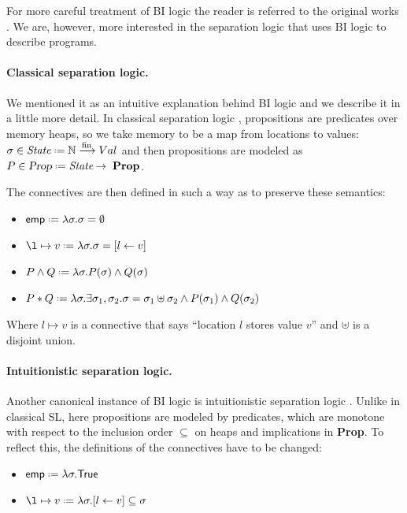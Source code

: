 For more careful treatment of BI logic the reader is referred to the original works \cite{ohearnLogicBunchedImplications1999, pymSemanticsProofTheory2002a}.
We are, however, more interested in the separation logic that uses BI logic to describe programs.

\paragraph{Classical separation logic.}
We mentioned it as an intuitive explanation behind BI logic and we describe it in a little more detail.
In classical separation logic \cite{ohearnLocalReasoningPrograms2001, reynoldsSeparationLogicLogic2002}, propositions are predicates over memory heaps, so we take memory to be a map from locations to values: \(\sigma \in \textit{State} \defeq \mathbb{N} \xrightarrow[]{\text{fin}} Val\) and then propositions are modeled as \(P \in \Prop \defeq \textit{State} \imp \textbf{Prop}\).

The connectives are then defined in such a way as to preserve these semantics:
\begin{itemize}
\item \(\emp \defeq \lambda \sigma. \sigma = \emptyset\)
\item \(\l \mapsto v \defeq \lambda \sigma. \sigma = [l \leftarrow v]\)
\item \(P \wedge Q \defeq \lambda \sigma. P (\sigma) \wedge Q (\sigma)\)
\item \(P \ast Q \defeq \lambda \sigma. \exists \sigma_1, \sigma_2. \sigma = \sigma_1 \uplus \sigma_2 \wedge P(\sigma_1) \wedge Q(\sigma_2)\)
\end{itemize}

Where \(l \mapsto v\) is a connective that says ``location \(l\) stores value \(v\)'' and \(\uplus\) is a disjoint union.

\paragraph{Intuitionistic separation logic.}
Another canonical instance of BI logic is intuitionistic separation logic \cite{reynoldsIntuitionisticReasoningShared2000}.
Unlike in classical SL, here propositions are modeled by predicates, which are monotone with respect to the inclusion order \(\subseteq\) on heaps and implications in \textbf{Prop}.
To reflect this, the definitions of the connectives have to be changed:
\begin{itemize}
\item \(\emp \defeq \lambda \sigma. \True \)
\item \(\l \mapsto v \defeq \lambda \sigma. [l \leftarrow v] \subseteq \sigma \)
\end{itemize}

